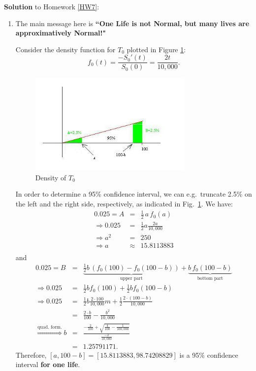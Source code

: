 \documentclass[11pt,fleqn,oneside]{book}
\begin{document}
\noindent \textbf{Solution} to Homework \ref{HW7}:
\footnotesize 
\begin{enumerate}
\item The main message here is \textbf{``One Life is not Normal, but many lives are approximatively Normal!"}

Consider the density function for $T_0$ plotted in Figure \ref{FIGHW4}:
$$
f_{0}(t) = \frac{-S_0'(t)}{S_0(0)} = \frac{2t}{10,000}.
$$
\begin{figure}
\begin{center}
\includegraphics[width=8cm]{Graphs/Graph_HW4.jpg}
\end{center}
\caption{Density of $T_0$ \label{FIGHW4}}
\end{figure}
In order to determine a 95\% confidence interval, we can e.g.\ truncate 2.5\% on the left and the right side, respectively, as indicated in Fig.\ \ref{FIGHW4}. We have:
\begin{eqnarray*}
0.025 = A &=& \frac{1}{2}\,a \, f_{0}(a) \\
\Rightarrow 0.025 &=& \frac{1}{2} a\frac{2a}{10,000}\\
\Rightarrow a^2 &=& 250 \\
\Rightarrow a &\approx& 15.8113883\\
\end{eqnarray*}
and
\begin{eqnarray*}
0.025 = B &=&\underbrace{\frac{1}{2} b \, \left(f_{0}(100) - f_{0}(100-b)\right)}_{\text{upper part}} + \underbrace{b\,f_{0}(100-b)}_{\text{bottom part}} \\
\Rightarrow 0.025 &=& \frac{1}{2} b f_{0}(100) + \frac{1}{2} b f_{0}(100-b) \\
\Rightarrow 0.025 &=& \frac{1}{2} b \frac{2\cdot 100}{10,000}m + \frac{1}{2}\frac{2\cdot (100-b)}{10,000} \\
&=& \frac{2\cdot b}{100} - \frac{b^2}{10,000}\\
\stackrel{\text{quad. form.}}{\Rightarrow} b &=& \frac{-\frac{2}{100}+\sqrt{\frac{4}{100} - \frac{1}{100,000}}}{\frac{-2}{10,000}}\\
&=& 1.25791171. 
\end{eqnarray*}
Therefore, $[a,100-b] = [15.8113883,98.74208829]$ is a 95\% confidence interval \textbf{for one life}.


\end{enumerate}
\end{document}
